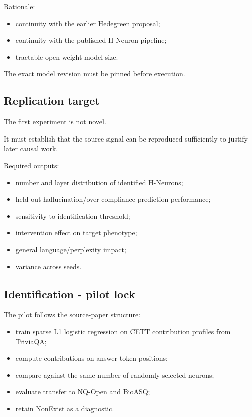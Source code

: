 Rationale:

\begin{itemize}
\tightlist
\item
  continuity with the earlier Hedegreen proposal;
\item
  continuity with the published H-Neuron pipeline;
\item
  tractable open-weight model size.
\end{itemize}

The exact model revision must be pinned before execution.

\subsection{Replication target}\label{replication-target}

The first experiment is not novel.

It must establish that the source signal can be reproduced sufficiently to justify later causal work.

Required outputs:

\begin{itemize}
\tightlist
\item
  number and layer distribution of identified H-Neurons;
\item
  held-out hallucination/over-compliance prediction performance;
\item
  sensitivity to identification threshold;
\item
  intervention effect on target phenotype;
\item
  general language/perplexity impact;
\item
  variance across seeds.
\end{itemize}

\subsection{Identification - pilot lock}\label{identification---pilot-lock}

The pilot follows the source-paper structure:

\begin{itemize}
\tightlist
\item
  train sparse L1 logistic regression on CETT contribution profiles from TriviaQA;
\item
  compute contributions on answer-token positions;
\item
  compare against the same number of randomly selected neurons;
\item
  evaluate transfer to NQ-Open and BioASQ;
\item
  retain NonExist as a diagnostic.
\end{itemize}

